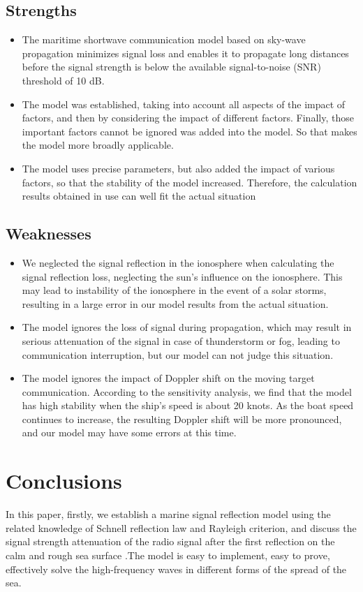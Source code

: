 \documentclass{mcmthesis}
\begin{document}
\subsection{Strengths}
\begin{itemize}
\item The maritime shortwave communication model based on sky-wave propagation minimizes signal loss and enables it to propagate long distances before the signal strength is below the available signal-to-noise (SNR) threshold of 10 dB.
\item The model was established, taking into account all aspects of the impact of factors, and then by considering the impact of different factors. Finally, those important factors cannot be ignored was added into the model. So that makes the model more broadly applicable.
\item The model uses precise parameters, but also added the impact of various factors, so that the stability of the model increased. Therefore, the calculation results obtained in use can well fit the actual situation
\end{itemize}

\subsection{Weaknesses}
\begin{itemize}
\item We neglected the signal reflection in the ionosphere when calculating the signal reflection loss, neglecting the sun's influence on the ionosphere. This may lead to instability of the ionosphere in the event of a solar storms, resulting in a large error in our model results from the actual situation.
\item The model ignores the loss of signal during propagation, which may result in serious attenuation of the signal in case of thunderstorm or fog, leading to communication interruption, but our model can not judge this situation.
\item The model ignores the impact of Doppler shift on the moving target communication. According to the sensitivity analysis, we find that the model has high stability when the ship's speed is about 20 knots. As the boat speed continues to increase, the resulting Doppler shift will be more pronounced, and our model may have some errors at this time.
\end{itemize}%



\section{Conclusions}
In this paper, firstly, we establish a marine signal reflection model using the related knowledge of Schnell reflection law and Rayleigh criterion, and discuss the signal strength attenuation of the radio signal after the first reflection on the calm and rough sea surface .The model is easy to implement, easy to prove, effectively solve the high-frequency waves in different forms of the spread of the sea.%
\end{document}
